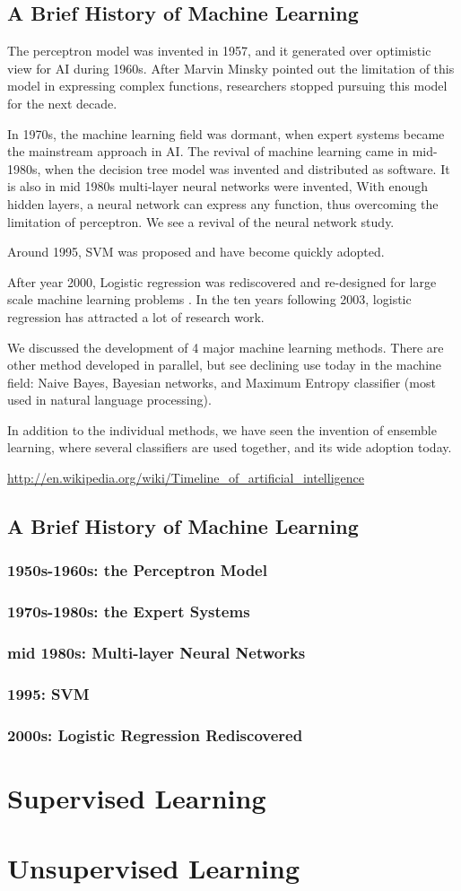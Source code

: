 \documentclass{book}
\begin{document}
\chapter{A Brief History of Machine Learning}
The perceptron model was invented in 1957, and it generated over optimistic view for AI during 1960s. After Marvin Minsky pointed out the limitation of this model in expressing complex functions, researchers stopped pursuing this model for the next decade.

In 1970s, the machine learning field was dormant, when expert systems became the mainstream approach in AI.  The revival of machine learning came in mid-1980s, when the decision tree model was invented and distributed as software. It is also in mid 1980s multi-layer neural networks were invented, With enough hidden layers, a neural network can express any function, thus overcoming the limitation of perceptron. We see a revival of the neural network study.

Around 1995, SVM was proposed and have become quickly adopted.

After year 2000, Logistic regression was rediscovered and re-designed for large scale machine learning problems . In the ten years following 2003, logistic regression has attracted a lot of research work.

We discussed the development of 4 major machine learning methods. There are other method developed in parallel, but see declining use today in the machine field: Naive Bayes, Bayesian networks, and Maximum Entropy classifier (most used in natural language processing). 

In addition to the individual methods, we have seen the invention of ensemble learning, where several classifiers are used together, and its wide adoption today. 


\url{http://en.wikipedia.org/wiki/Timeline_of_artificial_intelligence}

\chapter{A Brief History of Machine Learning}
\section{1950s-1960s: the Perceptron Model}
\section{1970s-1980s: the Expert Systems}
\section{mid 1980s: Multi-layer Neural Networks}
\section{1995: SVM}
\section{2000s: Logistic Regression Rediscovered}

\part{Supervised Learning}
\part{Unsupervised Learning}
\end{document}
